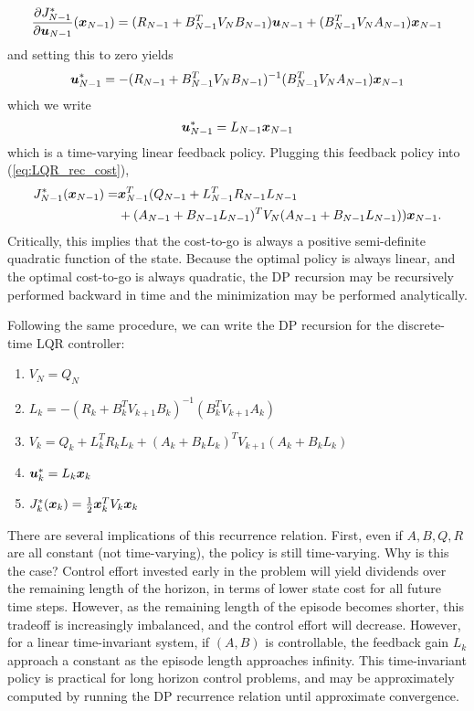\begin{equation}
    \frac{\partial J_{N-1}^*}{\partial \bm{u}_{N-1}}(\bm{x}_{N-1}) = (R_{N-1} + B_{N-1}^T V_N B_{N-1}) \bm{u}_{N-1} + (B_{N-1}^T V_N A_{N-1}) \bm{x}_{N-1}
\end{equation}
and setting this to zero yields
\begin{equation}
    \bm{u}^*_{N-1} = - (R_{N-1} + B_{N-1}^T V_N B_{N-1})^{-1} (B_{N-1}^T V_N A_{N-1}) \bm{x}_{N-1}
\end{equation}
which we write
\begin{equation}
    \bm{u}^*_{N-1} = L_{N-1} \bm{x}_{N-1}
\end{equation}
which is a time-varying linear feedback policy. Plugging this feedback policy into (\ref{eq:LQR_rec_cost}),
\begin{align}
    J_{N-1}^*(\bm{x}_{N-1}) =& \bm{x}_{N-1}^T (Q_{N-1}  + L_{N-1}^T R_{N-1} L_{N-1} \\
    & + (A_{N-1} + B_{N-1} L_{N-1})^T V_N   (A_{N-1} + B_{N-1} L_{N-1})) \bm{x}_{N-1}. \nonumber
\end{align}
Critically, this implies that the cost-to-go is always a positive semi-definite quadratic function of the state. Because the optimal policy is always linear, and the optimal cost-to-go is always quadratic, the DP recursion may be recursively performed backward in time and the minimization may be performed analytically. 

Following the same procedure, we can write the DP recursion for the discrete-time LQR controller:
\begin{enumerate}
    \item $V_N= Q_N$
    \item $L_k = - (R_{k} + B_{k}^T V_{k+1} B_{k})^{-1} (B_{k}^T V_{k+1} A_{k})$
    \item $V_{k} = Q_{k}  + L_{k}^T R_{k} L_{k} + (A_{k} + B_{k} L_{k})^T V_{k+1}   (A_{k} + B_{k} L_{k})$
    \item $\bm{u}^*_k = L_k \bm{x}_k$
    \item $J^*_k(\bm{x}_k) = \frac{1}{2} \bm{x}_k^T V_k \bm{x}_k$
\end{enumerate}
There are several implications of this recurrence relation. First, even if $A,B,Q,R$ are all constant (not time-varying), the policy is still time-varying. Why is this the case? Control effort invested early in the problem will yield dividends over the remaining length of the horizon, in terms of lower state cost for all future time steps. However, as the remaining length of the episode becomes shorter, this tradeoff is increasingly imbalanced, and the control effort will decrease. 
However, for a linear time-invariant system, if $(A,B)$ is controllable, the feedback gain $L_k$ approach a constant as the episode length approaches infinity. This time-invariant policy is practical for long horizon control problems, and may be approximately computed by running the DP recurrence relation until approximate convergence. 

